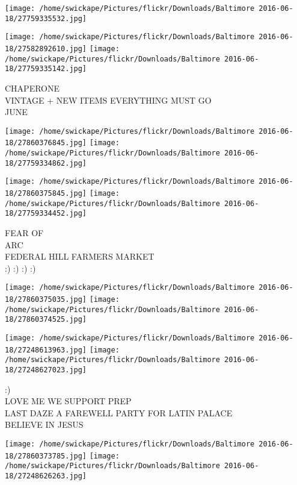 \documentclass[10pt,letterpaper]{article}
\begin{document}
\texttt{[image: /home/swickape/Pictures/flickr/Downloads/Baltimore 2016-06-18/27759335532.jpg]}

\vspace{0.25in}
\texttt{[image: /home/swickape/Pictures/flickr/Downloads/Baltimore 2016-06-18/27582892610.jpg]}
\texttt{[image: /home/swickape/Pictures/flickr/Downloads/Baltimore 2016-06-18/27759335142.jpg]}

CHAPERONE\\
VINTAGE + NEW ITEMS EVERYTHING MUST GO\\
JUNE\\
\pagebreak

\texttt{[image: /home/swickape/Pictures/flickr/Downloads/Baltimore 2016-06-18/27860376845.jpg]}
\texttt{[image: /home/swickape/Pictures/flickr/Downloads/Baltimore 2016-06-18/27759334862.jpg]}

\texttt{[image: /home/swickape/Pictures/flickr/Downloads/Baltimore 2016-06-18/27860375845.jpg]}
\texttt{[image: /home/swickape/Pictures/flickr/Downloads/Baltimore 2016-06-18/27759334452.jpg]}

FEAR OF\\
ARC\\
FEDERAL HILL FARMERS MARKET\\
:) :) :) :)\\
\pagebreak

\texttt{[image: /home/swickape/Pictures/flickr/Downloads/Baltimore 2016-06-18/27860375035.jpg]}
\texttt{[image: /home/swickape/Pictures/flickr/Downloads/Baltimore 2016-06-18/27860374525.jpg]}

\texttt{[image: /home/swickape/Pictures/flickr/Downloads/Baltimore 2016-06-18/27248613963.jpg]}
\texttt{[image: /home/swickape/Pictures/flickr/Downloads/Baltimore 2016-06-18/27248627023.jpg]}

:)\\
LOVE ME WE SUPPORT PREP\\
LAST DAZE A FAREWELL PARTY FOR LATIN PALACE\\
BELIEVE IN JESUS\\
\pagebreak

\texttt{[image: /home/swickape/Pictures/flickr/Downloads/Baltimore 2016-06-18/27860373785.jpg]}
\texttt{[image: /home/swickape/Pictures/flickr/Downloads/Baltimore 2016-06-18/27248626263.jpg]}
\end{document}
